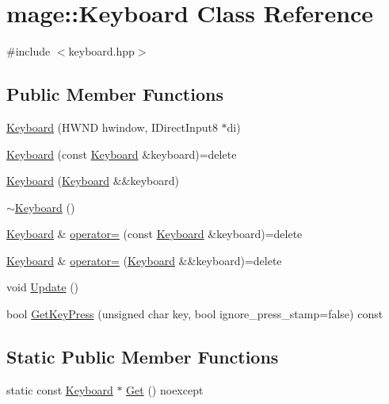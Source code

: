 \hypertarget{classmage_1_1_keyboard}{}\section{mage\+:\+:Keyboard Class Reference}
\label{classmage_1_1_keyboard}


{\ttfamily \#include $<$keyboard.\+hpp$>$}

\subsection*{Public Member Functions}
\begin{DoxyCompactItemize}
\item 
\hyperlink{classmage_1_1_keyboard_ac89c8f4132508901ff2ca57c68709928}{Keyboard} (H\+W\+ND hwindow, I\+Direct\+Input8 $\ast$di)
\item 
\hyperlink{classmage_1_1_keyboard_a39d07f8a5e37648ca9eba30aa55146bf}{Keyboard} (const \hyperlink{classmage_1_1_keyboard}{Keyboard} \&keyboard)=delete
\item 
\hyperlink{classmage_1_1_keyboard_aaa8f4c85cdc09b4f86169aad23d2c619}{Keyboard} (\hyperlink{classmage_1_1_keyboard}{Keyboard} \&\&keyboard)
\item 
\hyperlink{classmage_1_1_keyboard_a80a84ec68749fac71690fb45287d446a}{$\sim$\+Keyboard} ()
\item 
\hyperlink{classmage_1_1_keyboard}{Keyboard} \& \hyperlink{classmage_1_1_keyboard_ae3ba98190c8c14ea894c676888825f35}{operator=} (const \hyperlink{classmage_1_1_keyboard}{Keyboard} \&keyboard)=delete
\item 
\hyperlink{classmage_1_1_keyboard}{Keyboard} \& \hyperlink{classmage_1_1_keyboard_a4f381bc90cc6828b4d0313999b544e6e}{operator=} (\hyperlink{classmage_1_1_keyboard}{Keyboard} \&\&keyboard)=delete
\item 
void \hyperlink{classmage_1_1_keyboard_abb5fd91a304f8bbf8b15ab1a277dafaf}{Update} ()
\item 
bool \hyperlink{classmage_1_1_keyboard_a94d35ad5ad27e3fc9496f3ab1fa28e4d}{Get\+Key\+Press} (unsigned char key, bool ignore\+\_\+press\+\_\+stamp=false) const
\end{DoxyCompactItemize}
\subsection*{Static Public Member Functions}
\begin{DoxyCompactItemize}
\item 
static const \hyperlink{classmage_1_1_keyboard}{Keyboard} $\ast$ \hyperlink{classmage_1_1_keyboard_a696032d3a0d9bcf1a677a35e1e3d9aa8}{Get} () noexcept
\end{DoxyCompactItemize}
